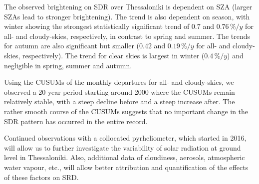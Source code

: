 \documentclass[applsci,article,submit,moreauthors,pdftex]{Definitions/mdpi}
\begin{document}
The observed brightening on SDR over Thessaloniki is dependent on SZA
(larger SZAs lead to stronger brightening). The trend is also dependent
on season, with winter showing the strongest statistically significant
trend of \(0.7\) and \(0.76\,\%/y\) for all- and cloudy-skies,
respectively, in contrast to spring and summer. The trends for autumn
are also significant but smaller (\(0.42\) and \(0.19\,\%/y\) for all-
and cloudy-skies, respectively). The trend for clear skies is largest in
winter (\(0.4\,\%/y\)) and negligible in spring, summer and autumn.

Using the CUSUMs of the monthly departures for all- and cloudy-skies, we
observed a 20-year period starting around 2000 where the CUSUMs remain
relatively stable, with a steep decline before and a steep increase
after. The rather smooth course of the CUSUMs suggests that no important
change in the SDR pattern has occurred in the entire record.

Continued observations with a collocated pyrheliometer, which started in
2016, will allow us to further investigate the variability of solar
radiation at ground level in Thessaloniki. Also, additional data of
cloudiness, aerosols, atmospheric water vapour, etc., will allow better
attribution and quantification of the effects of these factors on SRD.


\vspace{6pt}







\end{document}
